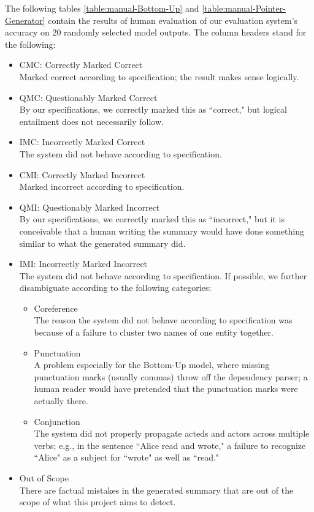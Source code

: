 \documentclass{article}
\begin{document}
The following tables \ref{table:manual-Bottom-Up} and \ref{table:manual-Pointer-Generator} contain the results of human evaluation of our evaluation system's accuracy on 20 randomly selected model outputs. The column headers stand for the following:
\begin{itemize}
    \item CMC: Correctly Marked Correct \\ Marked correct according to specification; the result makes sense logically.
    \item QMC: Questionably Marked Correct \\ By our specifications, we correctly marked this as ``correct," but logical entailment does not necessarily follow.
    \item IMC: Incorrectly Marked Correct \\ The system did not behave according to specification.
    \item CMI: Correctly Marked Incorrect \\ Marked incorrect according to specification.
    \item QMI: Questionably Marked Incorrect \\ By our specifications, we correctly marked this as ``incorrect," but it is conceivable that a human writing the summary would have done something similar to what the generated summary did.
    \item IMI: Incorrectly Marked Incorrect \\ The system did not behave according to specification. If possible, we further disambiguate according to the following categories:
    \begin{itemize}
        \item Coreference \\ The reason the system did not behave according to specification was because of a failure to cluster two names of one entity together.
        \item Punctuation \\ A problem especially for the Bottom-Up model, where missing punctuation marks (usually commas) throw off the dependency parser; a human reader would have pretended that the punctuation marks were actually there.
        \item Conjunction \\ The system did not properly propagate acteds and actors across multiple verbs; e.g., in the sentence ``Alice read and wrote," a  failure to recognize ``Alice" as a subject for ``wrote" as well as ``read."
    \end{itemize}
    \item Out of Scope \\
    There are factual mistakes in the generated summary that are out of the scope of what this project aims to detect.
\end{itemize}
\end{document}
